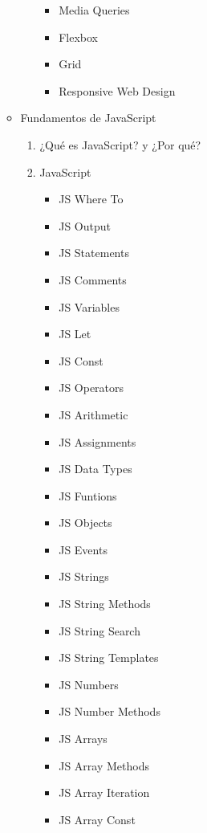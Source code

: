 \documentclass[12pt, letterpaper]{article}
\begin{document}
\begin{enumerate}
\begin{itemize}
\begin{enumerate}
\begin{itemize}
                \item Media Queries
                \item Flexbox
                \item Grid
                \item Responsive Web Design
            \end{itemize}
        \end{enumerate}
        \item Fundamentos de JavaScript
        \begin{enumerate}
            \item ¿Qué es JavaScript? y ¿Por qué?
            \item JavaScript
            \begin{itemize}
                \item JS Where To
                \item JS Output
                \item JS Statements
                \item JS Comments
                \item JS Variables
                \item JS Let
                \item JS Const
                \item JS Operators
                \item JS Arithmetic
                \item JS Assignments
                \item JS Data Types
                \item JS Funtions
                \item JS Objects
                \item JS Events
                \item JS Strings
                \item JS String Methods
                \item JS String Search
                \item JS String Templates
                \item JS Numbers
                \item JS Number Methods
                \item JS Arrays
                \item JS Array Methods
                \item JS Array Iteration
                \item JS Array Const

\end{itemize}
\end{enumerate}
\end{itemize}
\end{enumerate}
\end{document}

